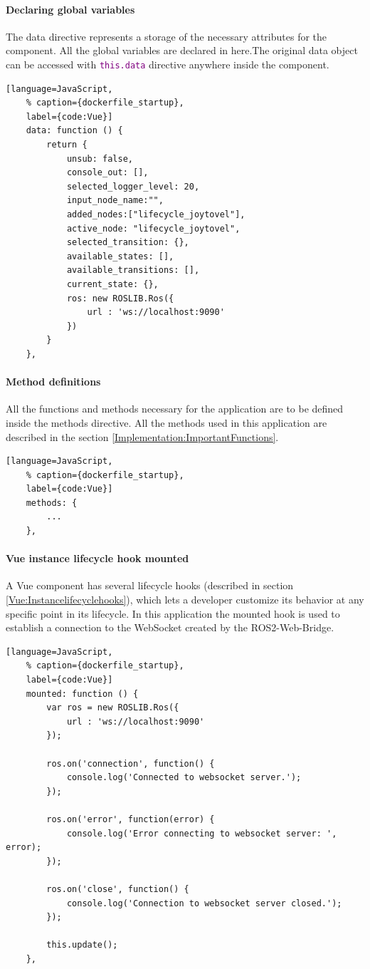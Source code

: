 \paragraph{Declaring global variables} The data directive represents a storage of the necessary attributes for the component. All the global variables are declared in here.The original data object can be accessed with \texttt{\textcolor{purple}{this.data}} directive anywhere inside the component.
\begin{lstlisting}[language=JavaScript,
	% caption={dockerfile_startup}, 
	label={code:Vue}]
	data: function () {
		return {
			unsub: false,
			console_out: [],
			selected_logger_level: 20,
			input_node_name:"",
			added_nodes:["lifecycle_joytovel"],
			active_node: "lifecycle_joytovel",
			selected_transition: {},
			available_states: [],
			available_transitions: [],
			current_state: {},
			ros: new ROSLIB.Ros({
				url : 'ws://localhost:9090'
			})
		}
	},
\end{lstlisting}

\paragraph{Method definitions} All the functions and methods necessary for the application are to be defined inside the methods directive. All the methods used in this application are described in the section \ref{Implementation:ImportantFunctions}.
\begin{lstlisting}[language=JavaScript,
	% caption={dockerfile_startup}, 
	label={code:Vue}]
	methods: {
		...
	},
\end{lstlisting}


\paragraph{Vue instance lifecycle hook mounted} A Vue component has several lifecycle hooks (described in section \ref{Vue:Instancelifecyclehooks}), which lets a developer customize its behavior at any specific point in its lifecycle. In this application the mounted hook is used to establish a connection to the WebSocket created by the ROS2-Web-Bridge.
\begin{lstlisting}[language=JavaScript,
	% caption={dockerfile_startup}, 
	label={code:Vue}]
	mounted: function () {
		var ros = new ROSLIB.Ros({
			url : 'ws://localhost:9090'
		});

		ros.on('connection', function() {
			console.log('Connected to websocket server.');
		});

		ros.on('error', function(error) {
			console.log('Error connecting to websocket server: ', error);
		});

		ros.on('close', function() {
			console.log('Connection to websocket server closed.');
		});

		this.update();
	},
\end{lstlisting}

